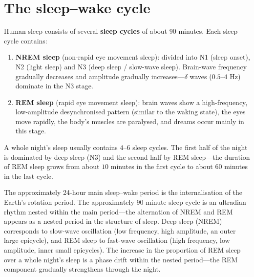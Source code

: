\section{The sleep--wake cycle}

\begin{definition}\label{def:sleep_cycle}
Human sleep consists of several \textbf{sleep cycles} of about 90 minutes. Each sleep cycle contains:
\begin{enumerate}[label=(\roman*)]
    \item \textbf{NREM sleep} (non-rapid eye movement sleep): divided into N1 (sleep onset), N2 (light sleep) and N3 (deep sleep / slow-wave sleep). Brain-wave frequency gradually decreases and amplitude gradually increases---$\delta$ waves ($0.5$--$4$ Hz) dominate in the N3 stage.
    \item \textbf{REM sleep} (rapid eye movement sleep): brain waves show a high-frequency, low-amplitude desynchronised pattern (similar to the waking state), the eyes move rapidly, the body's muscles are paralysed, and dreams occur mainly in this stage.
\end{enumerate}
A whole night's sleep usually contains $4$--$6$ sleep cycles. The first half of the night is dominated by deep sleep (N3) and the second half by REM sleep---the duration of REM sleep grows from about $10$ minutes in the first cycle to about $60$ minutes in the last cycle.

The approximately 24-hour main sleep--wake period is the internalisation of the Earth's rotation period. The approximately 90-minute sleep cycle is an ultradian rhythm nested within the main period---the alternation of NREM and REM appears as a nested period in the structure of sleep. Deep sleep (NREM) corresponds to slow-wave oscillation (low frequency, high amplitude, an outer large epicycle), and REM sleep to fast-wave oscillation (high frequency, low amplitude, inner small epicycles). The increase in the proportion of REM sleep over a whole night's sleep is a phase drift within the nested period---the REM component gradually strengthens through the night.
\end{definition}

